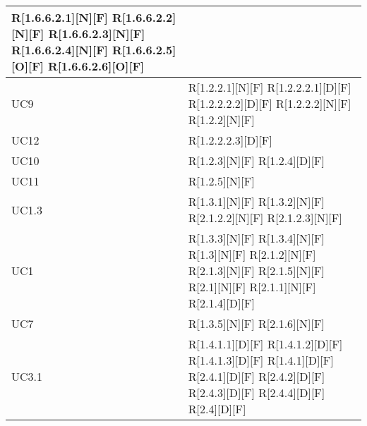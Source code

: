 \begin{longtable}{X | X}
R[1.6.6.2.1][N][F] \newline
R[1.6.6.2.2][N][F] \newline
R[1.6.6.2.3][N][F] \newline
R[1.6.6.2.4][N][F] \newline
R[1.6.6.2.5][O][F] \newline
R[1.6.6.2.6][O][F]  \\
\hline
UC9 & R[1.2.2.1][N][F] \newline
R[1.2.2.2.1][D][F] \newline
R[1.2.2.2.2][D][F] \newline
R[1.2.2.2][N][F] \newline
R[1.2.2][N][F]  \\
\hline
UC12 & R[1.2.2.2.3][D][F]  \\
\hline
UC10 & R[1.2.3][N][F] \newline
R[1.2.4][D][F]  \\
\hline
UC11 & R[1.2.5][N][F]  \\
\hline
UC1.3 & R[1.3.1][N][F] \newline
R[1.3.2][N][F] \newline
R[2.1.2.2][N][F] \newline
R[2.1.2.3][N][F]  \\
\hline
UC1 & R[1.3.3][N][F] \newline
R[1.3.4][N][F] \newline
R[1.3][N][F] \newline
R[2.1.2][N][F] \newline
R[2.1.3][N][F] \newline
R[2.1.5][N][F] \newline
R[2.1][N][F] \newline
R[2.1.1][N][F] \newline
R[2.1.4][D][F]  \\
\hline
UC7 & R[1.3.5][N][F] \newline
R[2.1.6][N][F]  \\
\hline
UC3.1 & R[1.4.1.1][D][F] \newline
R[1.4.1.2][D][F] \newline
R[1.4.1.3][D][F] \newline
R[1.4.1][D][F] \newline
R[2.4.1][D][F] \newline
R[2.4.2][D][F] \newline
R[2.4.3][D][F] \newline
R[2.4.4][D][F] \newline
R[2.4][D][F]  \\

\end{longtable}
